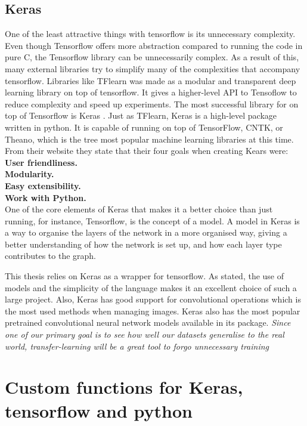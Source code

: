\subsection{Keras}
One of the least attractive things with tensorflow is its unnecessary complexity.  Even though Tensorflow offers more abstraction compared to running the code in pure C, the Tensorflow library can be unnecessarily complex.
As a result of this, many external libraries try to simplify many of the complexities that accompany tensorflow. 
Libraries like TFlearn was made as a modular and transparent deep learning library on top of tensorflow. It gives a higher-level API to Tensoflow to reduce complexity and speed up experiments. 
The most successful library for on top of Tensorflow is Keras . 
Just as TFlearn, Keras is a high-level package written in python. It is capable of running on top of TensorFlow, CNTK, or Theano, which is the tree most popular machine learning libraries at this time. 
From their website they state that their four goals when creating Kears were:
\textbf{User friendliness. }\\
\textbf{Modularity. }\\
\textbf{Easy extensibility.}\\ 
\textbf{Work with Python. }\\

One of the core elements of Keras that makes it a better choice than just running, for instance, Tensorflow, is the concept of a model. A model in Keras is a way to organise the layers of the network in a more organised way, giving a better understanding of how the network is set up, and how each layer type contributes to the graph. 

This thesis relies on Keras as a wrapper for tensorflow. As stated, the use of models and the simplicity of the language makes it an excellent choice of such a large project. Also, Keras has good support for convolutional operations which is the most used methods when managing images. Keras also has the most popular pretrained convolutional neural network models available in its package. \textit{Since one of our primary goal is to see how well our datasets generalise to the real world, transfer-learning will be a great tool to forgo unnecessary training}





    
\section{Custom functions for Keras, tensorflow and python}
